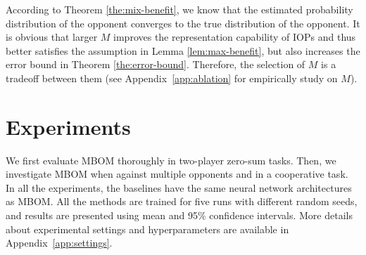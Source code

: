 \documentclass{article}
\begin{document}
According to Theorem \ref{the:mix-benefit}, we know that the estimated probability distribution of the opponent converges to the true distribution of the opponent. It is obvious that larger $M$ improves the representation capability of IOPs and thus better satisfies the assumption in Lemma \ref{lem:max-benefit}, but also increases the error bound in Theorem \ref{the:error-bound}. Therefore, the selection of $M$ is a tradeoff between them (see Appendix~\ref{app:ablation} for empirically study on $M$).








\section{Experiments}

We first evaluate MBOM thoroughly in two-player zero-sum tasks. Then, we investigate MBOM when against multiple opponents and in a cooperative task. In all the experiments, the baselines have the same neural network architectures as MBOM. All the methods are trained for five runs with different random seeds, and results are presented using mean and 95\% confidence intervals. More details about experimental settings and hyperparameters are available in Appendix~\ref{app:settings}.
\end{document}
